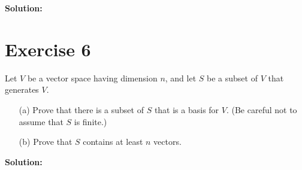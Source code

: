 \documentclass{article}
\begin{document}
\textbf{Solution:} \\

\newpage

\section*{Exercise 6}
Let $V$ be a vector space having dimension $n$, and let $S$ be a subset of $V$ that generates $V$.
\begin{itemize}
\item[(a)] Prove that there is a subset of $S$ that is a basis for $V$. (Be careful not to assume that $S$ is finite.)
\item[(b)] Prove that $S$ contains at least $n$ vectors.
\end{itemize}

\textbf{Solution:} \\
\end{document}
